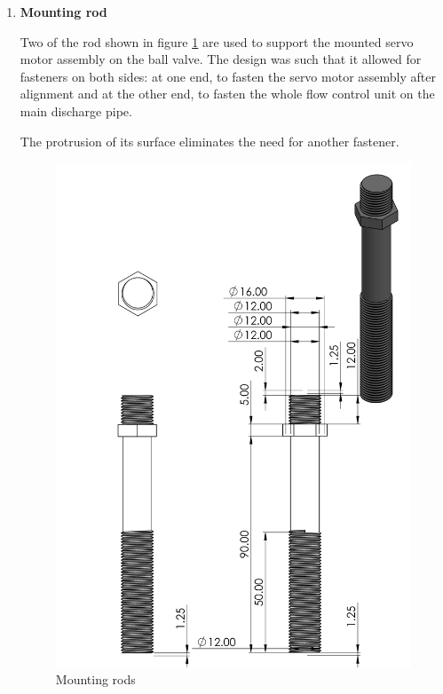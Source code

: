 \begin{enumerate}
\begin{enumerate}
     \par 
     \item \textbf{Mounting rod}
     \par
     Two of the rod shown in figure \ref{fig:mounting_rods} are used to support the mounted servo motor assembly on the ball valve. The design was such that it allowed for fasteners on both sides: at one end, to fasten the servo motor assembly after alignment and at the other end, to fasten the whole flow control unit on the main discharge pipe.
     \par
     The protrusion of its surface eliminates the need for another fastener. 
      \begin{figure}[H]
          \centering
          \includegraphics[height=.55\textheight]{Figures/ServoMotorMountRods.PNG}
          \caption{Mounting rods}
          \label{fig:mounting_rods}
      \end{figure}

\end{enumerate}
\end{enumerate}
